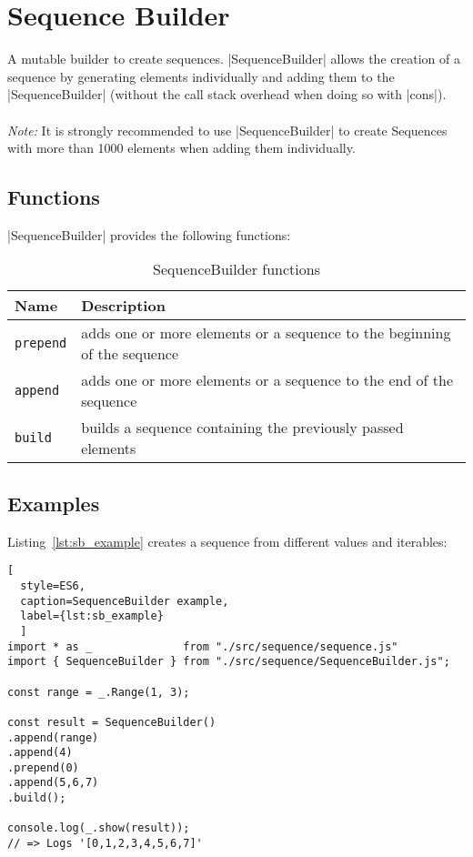 \section{Sequence Builder}
\label{sec:Sequence Builder}
A mutable builder to create sequences.
\newline
|SequenceBuilder| allows the creation of a sequence by generating elements individually 
and adding them to the |SequenceBuilder| (without the call stack overhead when doing so
with |cons|).\\
\\
\textit{Note:} It is strongly recommended to use |SequenceBuilder| to create
Sequences with more than 1000 elements when adding them individually.
\subsection{Functions}
\label{sub:sb_Functions}

|SequenceBuilder| provides the following functions:

\begin{table}[H]
  \centering
  \begin{tabularx}{\textwidth}{| l | X |} \hline
    \textbf{Name}    & \textbf{Description} \\ \hline
    \texttt{prepend} & adds one or more elements or a sequence to the beginning of the sequence\\ \hline 
    \texttt{append}  & adds one or more elements or a sequence to the end of the sequence\\ \hline 
    \texttt{build}   & builds a sequence containing the previously passed elements \\ \hline 
   \end{tabularx}
  \caption{SequenceBuilder functions}
  \label{tab:sb_functions}
\end{table}

\subsection{Examples}
\label{sub:sb_Examples}
Listing~\ref{lst:sb_example} creates a sequence from different values and iterables:

\begin{lstlisting}[
  style=ES6, 
  caption=SequenceBuilder example,
  label={lst:sb_example}
  ]
import * as _              from "./src/sequence/sequence.js"
import { SequenceBuilder } from "./src/sequence/SequenceBuilder.js";

const range = _.Range(1, 3);

const result = SequenceBuilder()
.append(range)
.append(4)
.prepend(0)
.append(5,6,7)
.build();

console.log(_.show(result));
// => Logs '[0,1,2,3,4,5,6,7]'
\end{lstlisting}
